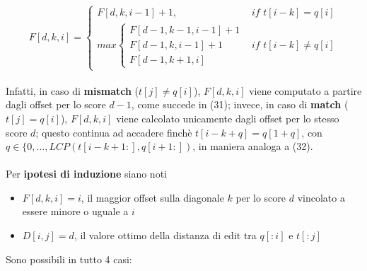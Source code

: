 \documentclass{article}
\begin{document}
\begin{equation}
    F[d,k,i] = \begin{cases}
         F[d,k,i-1] + 1, & \textit{if } t[i-k] = q[i] \\
         max \begin{cases}
            F[d-1, k-1, i-1] + 1 \\
            F[d-1, k, i-1] + 1 \\
            F[d-1, k+1, i]
        \end{cases} & \textit{if } t[i-k] \neq q[i]
    \end{cases}
\end{equation} \\
Infatti, in caso di \textbf{mismatch} ($t[j] \neq q[i]$), $F[d,k,i]$ viene computato a partire dagli offset per lo score $d-1$, come succede in (31); invece, in caso di \textbf{match} ($t[j] = q[i]$), $F[d,k,i]$ viene calcolato unicamente dagli offset per lo stesso score $d$; questo continua ad accadere finchè $t[i - k + q] = q[1 + q]$, con $q \in \{0, ..., LCP(t[i - k + 1:], q[i + 1:])$, in maniera analoga a (32).\\ \\
Per \textbf{ipotesi di induzione} siano noti
\begin{itemize}
    \item $F[d, k, i] = i$, il maggior offset sulla diagonale $k$ per lo score $d$ vincolato a essere minore o uguale a $i$
    
    \item $D[i, j] = d$, il valore ottimo della distanza di edit tra $q[:i]$ e $t[:j]$
\end{itemize}
Sono possibili in tutto 4 casi:
\end{document}
